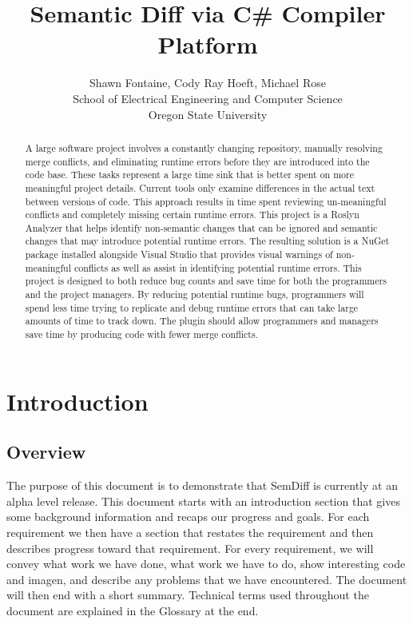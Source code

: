 \documentclass[10pt,draftclsnofoot,onecolumn]{IEEEtran}
\begin{document}
\lstset{style=cSharp}
\title{Semantic Diff via C\# Compiler Platform}

\author{Shawn Fontaine, Cody Ray Hoeft, Michael Rose\\
	School of Electrical Engineering and Computer Science\\
	Oregon State University}

\maketitle
\thispagestyle{empty} %


\begin{abstract}
A large software project involves a constantly changing repository, manually resolving merge conflicts, and eliminating runtime errors before they are introduced into the code base. These tasks represent a large time sink that is better spent on more meaningful project details. Current tools only examine differences in the actual text between versions of code. This approach results in time spent reviewing un-meaningful conflicts and completely missing certain runtime errors. This project is a Roslyn Analyzer that helps identify non-semantic changes that can be ignored and semantic changes that may introduce potential runtime errors. The resulting solution is a NuGet package installed alongside Visual Studio that provides visual warnings of non-meaningful conflicts as well as assist in identifying potential runtime errors. This project is designed to both reduce bug counts and save time for both the programmers and the project managers. By reducing potential runtime bugs, programmers will spend less time trying to replicate and debug runtime errors that can take large amounts of time to track down. The plugin should allow programmers and managers save time by producing code with fewer merge conflicts.
\end{abstract}
\newpage
\setcounter{page}{1}

\section{Introduction}
\subsection{Overview}
The purpose of this document is to demonstrate that SemDiff is currently at an alpha level release. This document starts with an introduction section that gives some background information and recaps our progress and goals. For each requirement we then have a section that restates the requirement and then describes progress toward that requirement. For every requirement, we will convey what work we have done, what work we have to do, show interesting code and imagen, and describe any problems that we have encountered. The document will then end with a short summary. Technical terms used throughout the document are explained in the Glossary at the end.
\end{document}
